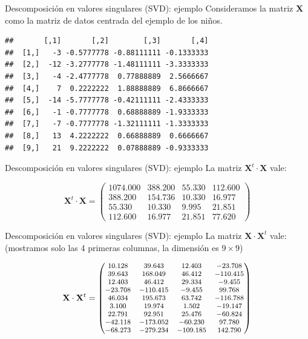 \documentclass[
  ignorenonframetext,
]{beamer}
\begin{document}
\begin{frame}[fragile]{Descomposición en valores singulares (SVD):
ejemplo}
\label{descomposiciuxf3n-en-valores-singulares-svd-ejemplo}
Consideramos la matriz \(\mathbf{X}\) como la matriz de datos centrada
del ejemplo de los niños.

\begin{verbatim}
##       [,1]       [,2]        [,3]       [,4]
##  [1,]   -3 -0.5777778 -0.88111111 -0.1333333
##  [2,]  -12 -3.2777778 -1.48111111 -3.3333333
##  [3,]   -4 -2.4777778  0.77888889  2.5666667
##  [4,]    7  0.2222222  1.88888889  6.8666667
##  [5,]  -14 -5.7777778 -0.42111111 -2.4333333
##  [6,]   -1 -0.7777778  0.68888889 -1.9333333
##  [7,]   -7 -0.7777778 -1.32111111 -1.3333333
##  [8,]   13  4.2222222  0.66888889  0.6666667
##  [9,]   21  9.2222222  0.07888889 -0.9333333
\end{verbatim}
\end{frame}

\begin{frame}{Descomposición en valores singulares (SVD): ejemplo}
\label{descomposiciuxf3n-en-valores-singulares-svd-ejemplo-1}
La matriz \(\mathbf{X}^t\cdot \mathbf{X}\) vale:

\[
\mathbf{X}^t\cdot \mathbf{X}=\begin{pmatrix}
  1074.000 & 388.200 & 55.330 & 112.600 \\ 
  388.200 & 154.736 & 10.330 & 16.977 \\ 
  55.330 & 10.330 & 9.995 & 21.851 \\ 
  112.600 & 16.977 & 21.851 & 77.620 
\end{pmatrix}
\]
\end{frame}

\begin{frame}{Descomposición en valores singulares (SVD): ejemplo}
\label{descomposiciuxf3n-en-valores-singulares-svd-ejemplo-2}
La matriz \(\mathbf{X}\cdot \mathbf{X}^t\) vale: (mostramos solo las 4
primeras columnas, la dimensión es \(9\times 9\))

\[
{\footnotesize
\mathbf{X}\cdot \mathbf{X}^t=\begin{pmatrix}
10.128 & 39.643 & 12.403 & -23.708 \\ 
  39.643 & 168.049 & 46.412 & -110.415 \\ 
  12.403 & 46.412 & 29.334 & -9.455 \\ 
  -23.708 & -110.415 & -9.455 & 99.768 \\ 
  46.034 & 195.673 & 63.742 & -116.788 \\ 
  3.100 & 19.974 & 1.502 & -19.147 \\ 
  22.791 & 92.951 & 25.476 & -60.824 \\ 
  -42.118 & -173.052 & -60.230 & 97.780 \\ 
  -68.273 & -279.234 & -109.185 & 142.790
\end{pmatrix}
}
\]
\end{frame}
\end{document}
